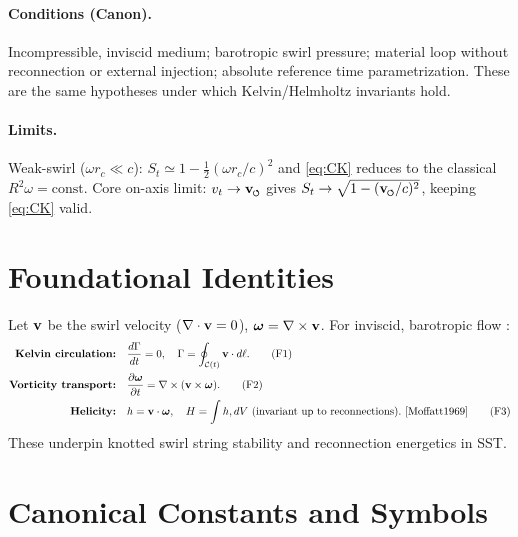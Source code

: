 \documentclass[11pt]{article}
\begin{document}
    \paragraph{Conditions (Canon).}
    Incompressible, inviscid medium; barotropic swirl pressure; material loop without reconnection or
    external injection; absolute reference time parametrization. These are the same hypotheses under which
    Kelvin/Helmholtz invariants hold.

    \paragraph{Limits.}
    Weak-swirl ($\omega r_c\!\ll\!c$): $S_t\simeq 1-\tfrac{1}{2}(\omega r_c/c)^2$ and \eqref{eq:CK} reduces to the
    classical $R^2\omega=\text{const}$. Core on-axis limit: $v_t\to\vswirl$ gives
    $S_t\to \sqrt{1-(\vswirl/c)^2}$, keeping \eqref{eq:CK} valid.

\section{Foundational Identities}
\label{sec:foundational-identities}
    Let $\vb v$ be the swirl velocity ($\nabla\cdot \vb v=0$), $\bm{\omega}=\nabla\times \vb v$. For inviscid, barotropic flow \cite{Helmholtz1858,Kelvin1869,Batchelor1967,LandauLifshitz1987}:
    \begin{align}
    \textbf{Kelvin circulation:} & \quad \frac{d\Gamma}{dt}=0,\quad \Gamma=\oint_{\mathcal{C}(t)} \vb v\cdot d\vb \ell. \tag{F1} \label{eq:kelvin} \\
    \textbf{Vorticity transport:} & \quad \pdv{\bm{\omega}}{t} = \nabla\times(\vb v\times \bm{\omega}). \tag{F2} \label{eq:vorticity-transport}\\
    \textbf{Helicity:} & \quad h=\vb v\cdot \bm{\omega},\quad H=\int h, dV\ \text{(invariant up to reconnections)}.~\cite{Moffatt1969} \tag{F3}\label{eq:helicity}
    \end{align}
    These underpin knotted swirl string stability and reconnection energetics in SST.


\section{Canonical Constants and Symbols}
\label{sec:canonical_constants}
\end{document}
